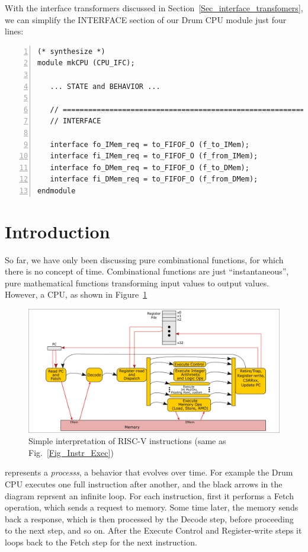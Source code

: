 With the interface transformers discussed in
Section~\ref{Sec_interface_transfomers}, we can simplify the INTERFACE
section of our Drum CPU module just four lines:


\begin{Verbatim}[frame=single, numbers=left]
(* synthesize *)
module mkCPU (CPU_IFC);

   ... STATE and BEHAVIOR ...

   // ================================================================
   // INTERFACE

   interface fo_IMem_req = to_FIFOF_O (f_to_IMem);
   interface fi_IMem_req = to_FIFOF_O (f_from_IMem);
   interface fo_DMem_req = to_FIFOF_O (f_to_DMem);
   interface fi_DMem_req = to_FIFOF_O (f_from_DMem);
endmodule
\end{Verbatim}


\section{Introduction}

So far, we have only been discussing pure combinational functions, for
which there is no concept of time.  Combinational functions are just
``instantaneous'', pure mathematical functions transforming input
values to output values.  However, a CPU, as shown in
Figure~\ref{Fig_FSMs_Simple_Instr_Exec}
\begin{figure}[htbp]
  \centerline{\includegraphics[width=6in,angle=0]{ch030_RISCV_Design_Space/Figures/Fig_Instr_Exec}}
  \caption{\label{Fig_FSMs_Simple_Instr_Exec}Simple interpretation of RISC-V instructions (same as Fig.~\ref{Fig_Instr_Exec})}
\end{figure}
represents a \emph{processs}, a behavior that evolves over time.  For
example the Drum CPU executes one full instruction after another,
and the black arrows in the diagram reprsent an infinite loop. For
each instruction, first it performs a Fetch operation, which sends a
request to memory. Some time later, the memory sends back a response,
which is then processed by the Decode step, before proceeding to the
next step, and so on.  After the Execute Control and Register-write
steps it loops back to the Fetch step for the next instruction.

